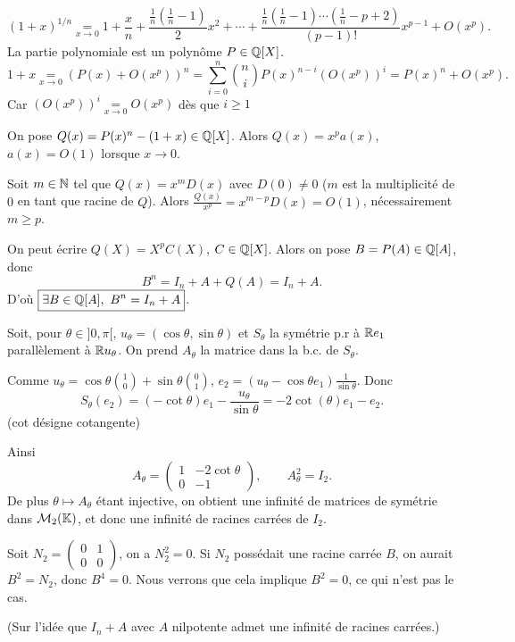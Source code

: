 \begin{solution}
\[
(1+x)^{1/n}\underset{x\to0}{=}
1+\frac xn+\frac{\frac1n(\frac1n-1)}2x^2+\cdots+
\frac{\frac1n(\frac1n-1)\cdots(\frac1n-p+2)}{(p-1)!}x^{p-1}+O(x^p).
\]
La partie polynomiale est un polynôme $P\in\mathbb Q[X]$.
\[
1+x\underset{x\to0}{=}(P(x)+O(x^p))^n
=\sum_{i=0}^n\binom niP(x)^{n-i}(O(x^p))^i
=P(x)^n+O(x^p).
\]
Car $(O(x^p))^i\underset{x\to0}{=}O(x^p)$ dès que $i\geq1$

On pose $Q(x)=P(x)^n-(1+x)\in\mathbb Q[X]$. Alors $Q(x)=x^pa(x)$,
$a(x)=O(1)$ lorsque $x\to0$.

Soit $m\in\mathbb N$ tel que $Q(x)=x^mD(x)$ avec $D(0)\neq0$ ($m$ est la multiplicité de $0$
en tant que racine de $Q$). Alors $\frac{Q(x)}{x^p}=x^{m-p}D(x)=O(1)$, nécessairement
$m\geq p$.

On peut écrire $Q(X)=X^pC(X)$, $C\in\mathbb Q[X]$. Alors on pose $B=P(A)\in\mathbb Q[A]$, donc
\[
B^n=I_n+A+Q(A)=I_n+A.
\]
D'où $\boxed{\exists B\in\Q[A],\ B^n=I_n+A}$.

\begin{remarkbox}
Soit, pour $\theta\in]0,\pi[$,
$u_\theta=(\cos\theta,\sin\theta)$ et $S_\theta$ la symétrie p.r à $\mathbb R e_1$
parallèlement à $\mathbb R u_\theta$. On prend $A_\theta$ la matrice dans la b.c. de $S_\theta$.

Comme $u_\theta=\cos\theta\binom10+\sin\theta\binom01$,
$e_2=(u_\theta-\cos\theta e_1)\frac1{\sin\theta}$. Donc
\[
S_\theta(e_2)=(-\cot\theta)e_1-\frac{u_\theta}{\sin\theta}
=-2\cot(\theta)e_1-e_2.
\]
(cot désigne cotangente)

Ainsi
\[
A_\theta=\begin{pmatrix}1&-2\cot\theta\\0&-1\end{pmatrix},
\qquad A_\theta^2=I_2.
\]
De plus $\theta\longmapsto A_\theta$ étant injective, on obtient une infinité de matrices
de symétrie dans $\mathcal M_2(\mathbb K)$, et donc une infinité de racines carrées de $I_2$.

Soit $N_2=\begin{pmatrix}0&1\\0&0\end{pmatrix}$, on a $N_2^2=0$. Si $N_2$ possédait
une racine carrée $B$, on aurait $B^2=N_2$, donc $B^4=0$. Nous verrons que cela implique
$B^2=0$, ce qui n'est pas le cas.

(Sur l'idée que $I_n+A$ avec $A$ nilpotente admet une infinité de racines carrées.)
\end{remarkbox}
\end{solution}

